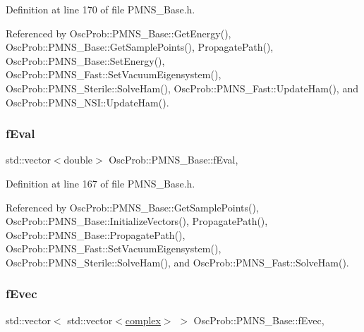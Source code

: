 Definition at line 170 of file P\+M\+N\+S\+\_\+\+Base.\+h.



Referenced by Osc\+Prob\+::\+P\+M\+N\+S\+\_\+\+Base\+::\+Get\+Energy(), Osc\+Prob\+::\+P\+M\+N\+S\+\_\+\+Base\+::\+Get\+Sample\+Points(), Propagate\+Path(), Osc\+Prob\+::\+P\+M\+N\+S\+\_\+\+Base\+::\+Set\+Energy(), Osc\+Prob\+::\+P\+M\+N\+S\+\_\+\+Fast\+::\+Set\+Vacuum\+Eigensystem(), Osc\+Prob\+::\+P\+M\+N\+S\+\_\+\+Sterile\+::\+Solve\+Ham(), Osc\+Prob\+::\+P\+M\+N\+S\+\_\+\+Fast\+::\+Update\+Ham(), and Osc\+Prob\+::\+P\+M\+N\+S\+\_\+\+N\+S\+I\+::\+Update\+Ham().

\mbox{\label{classOscProb_1_1PMNS__Base_a6319c34d7decbb9d7d6da279c06e8c2d}} 
\subsubsection{\texorpdfstring{f\+Eval}{fEval}}
{\footnotesize\ttfamily std\+::vector$<$double$>$ Osc\+Prob\+::\+P\+M\+N\+S\+\_\+\+Base\+::f\+Eval\hspace{0.3cm}{\ttfamily [protected]}, {\ttfamily [inherited]}}



Definition at line 167 of file P\+M\+N\+S\+\_\+\+Base.\+h.



Referenced by Osc\+Prob\+::\+P\+M\+N\+S\+\_\+\+Base\+::\+Get\+Sample\+Points(), Osc\+Prob\+::\+P\+M\+N\+S\+\_\+\+Base\+::\+Initialize\+Vectors(), Propagate\+Path(), Osc\+Prob\+::\+P\+M\+N\+S\+\_\+\+Base\+::\+Propagate\+Path(), Osc\+Prob\+::\+P\+M\+N\+S\+\_\+\+Fast\+::\+Set\+Vacuum\+Eigensystem(), Osc\+Prob\+::\+P\+M\+N\+S\+\_\+\+Sterile\+::\+Solve\+Ham(), and Osc\+Prob\+::\+P\+M\+N\+S\+\_\+\+Fast\+::\+Solve\+Ham().

\mbox{\label{classOscProb_1_1PMNS__Base_a093e7bd31d4ef52ed52df414e12c1d17}} 
\subsubsection{\texorpdfstring{f\+Evec}{fEvec}}
{\footnotesize\ttfamily std\+::vector$<$ std\+::vector$<$\hyperlink{classOscProb_1_1PMNS__Base_ae86ec4718808ce9d02e5f5b4226714ab}{complex}$>$ $>$ Osc\+Prob\+::\+P\+M\+N\+S\+\_\+\+Base\+::f\+Evec\hspace{0.3cm}{\ttfamily [protected]}, {\ttfamily [inherited]}}



